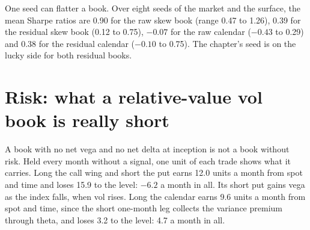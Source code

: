 \begin{omfigure}

\label{fig:s2:skew-and-term-structure-relative-value:calendar}
\end{omfigure}

One seed can flatter a book. Over eight seeds of the market and the surface, the mean Sharpe ratios are 0.90 for the raw skew book (range 0.47 to
1.26), 0.39 for the residual skew book (0.12 to 0.75), $-0.07$ for the raw calendar ($-0.43$ to 0.29) and 0.38 for the residual calendar ($-0.10$ to
0.75). The chapter's seed is on the lucky side for both residual books.

\section{Risk: what a relative-value vol book is really short}

A book with no net vega and no net delta at inception is not a book without risk. Held every month without a signal, one unit of each trade shows
what it carries. Long the call wing and short the put earns 12.0 units a month from spot and time and loses 15.9 to the level: $-6.2$ a month in
all. Its short put gains vega as the index falls, when vol rises. Long the calendar earns 9.6 units a month from spot and time, since the short
one-month leg collects the variance premium through theta, and loses 3.2 to the level: 4.7 a month in all.

